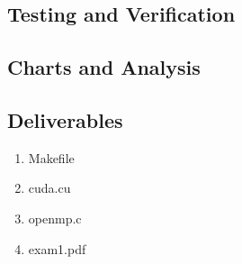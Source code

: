 \documentclass[12pt]{article}
\begin{document}
\subsection*{Testing and Verification}

\subsection*{Charts and Analysis}

\subsection*{Deliverables}
\begin{enumerate}
	\item Makefile
	\item cuda.cu
	\item openmp.c
	\item exam1.pdf
\end{enumerate}
\end{document}
